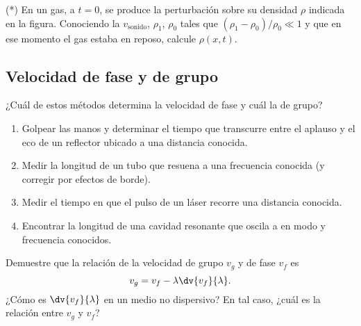 \item 
\begin{minipage}[t][1.5cm]{0.7\textwidth}
(*) En un gas, a $t=0$, se produce la perturbación sobre su densidad \(\rho\) indicada en la figura.
Conociendo la $v_\text{sonido}$, $\rho_{1}$, $\rho_{0}$ tales que $(\rho_{1}-\rho_{0})/\rho_{0}\ll1$ y que en ese momento el gas estaba en reposo, calcule $\rho(x,t)$.
\end{minipage}
\begin{minipage}[c][1.6cm][t]{0.2\textwidth}
\end{minipage}





\subsection*{Velocidad de fase y de grupo}

\item ¿Cuál de estos métodos determina la velocidad de fase y cuál la de grupo?
\begin{enumerate}
\item Golpear las manos y determinar el tiempo que transcurre entre el aplauso y el eco de un reflector ubicado a una distancia conocida.
\item Medir la longitud de un tubo que resuena a una frecuencia conocida (y corregir por efectos de borde).
\item Medir el tiempo en que el pulso de un láser recorre una distancia conocida.
\item Encontrar la longitud de una cavidad resonante que oscila a en modo y frecuencia conocidos.
\end{enumerate}


\item Demuestre que la relación de la velocidad de grupo $v_g$ y de fase $v_f$ es
$$
v_g = v_f - \lambda \dv{v_f}{\lambda}.
$$
¿Cómo es $\dv{v_f}{\lambda}$ en un medio no dispersivo?
En tal caso, ¿cuál es la relación entre $v_g$ y $v_f$?

